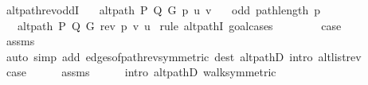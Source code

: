 \begin{isabellebody}
\isanewline
%
\isadeliminvisible
\isanewline
%
\endisadeliminvisible
%
\isataginvisible
{}\isamarkupfalse%
\ alt{\isacharunderscore}{\kern0pt}path{\isacharunderscore}{\kern0pt}rev{\isacharunderscore}{\kern0pt}oddI{\isacharcolon}{\kern0pt}\isanewline
\ \ \ {\isachardoublequoteopen}alt{\isacharunderscore}{\kern0pt}path\ P\ Q\ G\ p\ u\ v{\isachardoublequoteclose}\isanewline
\ \ \ {\isachardoublequoteopen}odd\ {\isacharparenleft}{\kern0pt}path{\isacharunderscore}{\kern0pt}length\ p{\isacharparenright}{\kern0pt}{\isachardoublequoteclose}\isanewline
\ \ \ {\isachardoublequoteopen}alt{\isacharunderscore}{\kern0pt}path\ P\ Q\ G\ {\isacharparenleft}{\kern0pt}rev\ p{\isacharparenright}{\kern0pt}\ v\ u{\isachardoublequoteclose}%
\endisataginvisible
{\isafoldinvisible}%
%
\isadeliminvisible
%
\endisadeliminvisible
\isanewline
%
\isadelimproof
%
\endisadelimproof
%
\isatagproof
{}\isamarkupfalse%
\ {\isacharparenleft}{\kern0pt}rule\ alt{\isacharunderscore}{\kern0pt}pathI{\isacharcomma}{\kern0pt}\ goal{\isacharunderscore}{\kern0pt}cases{\isacharparenright}{\kern0pt}\isanewline
\ \ \isamarkupfalse%
\ {}\isanewline
\ \ \isamarkupfalse%
\ {\isacharquery}{\kern0pt}case\isanewline
\ \ \ \ \isamarkupfalse%
\ assms\isanewline
\ \ \ \ \isamarkupfalse%
\ {\isacharparenleft}{\kern0pt}auto\ simp\ add{\isacharcolon}{\kern0pt}\ edges{\isacharunderscore}{\kern0pt}of{\isacharunderscore}{\kern0pt}path{\isacharunderscore}{\kern0pt}rev{\isacharbrackleft}{\kern0pt}symmetric{\isacharbrackright}{\kern0pt}\ dest{\isacharcolon}{\kern0pt}\ alt{\isacharunderscore}{\kern0pt}pathD{\isacharparenleft}{\kern0pt}{}{\isacharparenright}{\kern0pt}\ intro{\isacharcolon}{\kern0pt}\ alt{\isacharunderscore}{\kern0pt}list{\isacharunderscore}{\kern0pt}rev{\isacharparenright}{\kern0pt}\isanewline
{}\isamarkupfalse%
\isanewline
\ \ \isamarkupfalse%
\ {}\isanewline
\ \ \isamarkupfalse%
\ {\isacharquery}{\kern0pt}case\isanewline
\ \ \ \ \isamarkupfalse%
\ assms{\isacharparenleft}{\kern0pt}{}{\isacharparenright}{\kern0pt}\isanewline
\ \ \ \ \isamarkupfalse%
\ {\isacharparenleft}{\kern0pt}intro\ alt{\isacharunderscore}{\kern0pt}pathD{\isacharparenleft}{\kern0pt}{}{\isacharparenright}{\kern0pt}\ walk{\isacharunderscore}{\kern0pt}symmetric{\isacharparenright}{\kern0pt}\isanewline
{}\isamarkupfalse%
%
\endisatagproof

\end{isabellebody}
